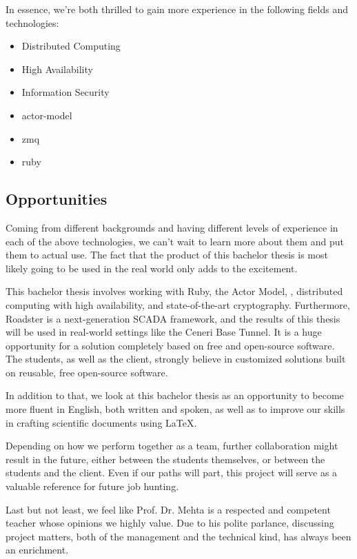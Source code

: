 \noindent
In essence, we're both thrilled to gain more experience in the following
fields and technologies:

\begin{itemize}
	\item Distributed Computing
	\item High Availability
	\item Information Security
	\item \gls{actor-model}
	\item \gls{zmq}
	\item \gls{ruby}
\end{itemize}

\subsection*{Opportunities}
Coming from different backgrounds and having different levels of experience in
each of the above technologies, we can't wait to learn more about them and put
them to actual use. The fact that the product of this bachelor thesis is most
likely going to be used in the real world only adds to the excitement.

This bachelor thesis involves working with Ruby, the Actor Model, \zmq,
distributed computing with high availability, and state-of-the-art
cryptography. Furthermore, Roadster is a next-generation SCADA framework, and
the results of this thesis will be used in real-world settings like the Ceneri
Base Tunnel. It is a huge opportunity for a solution completely based on free
and open-source software. The students, as well as the client, strongly believe
in customized solutions built on reusable, free open-source software.

In addition to that, we look at this bachelor thesis as an opportunity to
become more fluent in English, both written and spoken, as well as to improve
our skills in crafting scientific documents using {\LaTeX}.

Depending on how we perform together as a team, further collaboration might
result in the future, either between the students themselves, or between the
students and the client. Even if our paths will part, this project will
serve as a valuable reference for future job hunting.

Last but not least, we feel like Prof. Dr. Mehta is a respected and competent
teacher whose opinions we highly value. Due to his polite parlance, discussing
project matters, both of the management and the technical kind, has always been
an enrichment.

